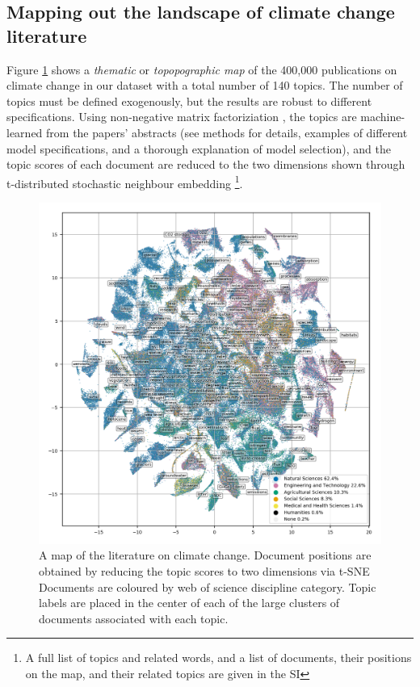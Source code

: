 \documentclass{article}
\begin{document}
\begin{linenumbers}
		
		\subsection*{Mapping out the landscape of climate change literature}
		
		Figure \ref{oecd_topic_map} shows a \emph{thematic} or \emph{topopographic map} of the 400,000 publications on climate change in our dataset with a total number of 140 topics. The number of topics must be defined exogenously, but the results are robust to different specifications. Using non-negative matrix factoriziation \cite{Lee1999}, the topics are machine-learned from the papers' abstracts (see methods for details, examples of different model specifications, and a thorough explanation of model selection), and the topic scores of each document are reduced to the two dimensions shown through t-distributed stochastic neighbour embedding \cite{vandermaaten2008} \footnote{A full list of topics and related words, and a list of documents, their positions on the map, and their related topics are given in the SI}.
		
		
		\begin{figure}[htp]
			\begin{center}
				\includegraphics[width=180mm]{plots_pub/all_topic_words_oecds.png}
				\caption{A map of the literature on climate change. Document positions are obtained by reducing the topic scores to two dimensions via t-SNE Documents are coloured by web of science discipline category. Topic labels are placed in the center of each of the large clusters of documents associated with each topic. }
				\label{oecd_topic_map}
			\end{center}
		\end{figure}
		

\end{linenumbers}
\end{document}
